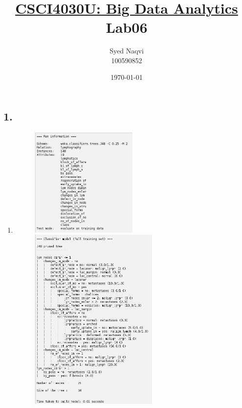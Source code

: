 \documentclass{article}
\title{\textbf{\underline{CSCI4030U: Big Data Analytics}\\Lab06}}
\author{Syed Naqvi\\100590852}
\date{\today}
\begin{document}
    \maketitle

    \subsection*{1.}
    
    \begin{enumerate}[label = (\alph*), left=10pt, itemsep=10pt]
        
        \item \begin{minipage}[t]{0.9\textwidth}
            \begin{figure}[H]
                \includegraphics[width=0.5\textwidth, height=0.2\textheight]{./6ai1.png}\\
                \includegraphics[width=0.6\textwidth, height=0.3\textheight]{./6aii1.png}\\

\end{figure}
\end{minipage}
\end{enumerate}
\end{document}
